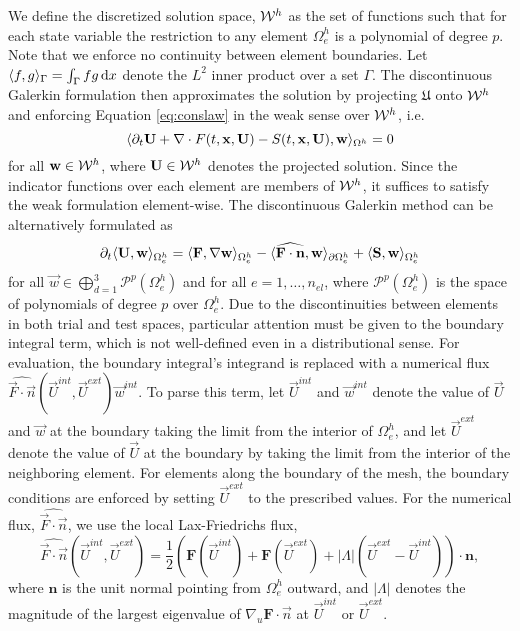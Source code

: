 We define the discretized solution space, $\mathcal{W}^h$ as the set of functions such that for each state variable the restriction to any element $\Omega_e^h$ is a polynomial of degree $p$.  Note that we enforce no continuity between element boundaries.  Let $\langle f , g\rangle_{\Gamma} = \int_{\Gamma} fg \,\mathrm{d} x$ denote the $L^2$ inner product over a set $\Gamma$. The discontinuous Galerkin formulation then approximates the solution by projecting $\mathfrak{U}$ onto $\mathcal{W}^h$ and enforcing Equation \eqref{eq:conslaw} in the weak sense over $\mathcal{W}^h$, i.e.
\begin{equation*}
\langle  \partial_t {\bf U} + \nabla \cdot F(t,{\bf x},{\bf U}) - S(t,{\bf x}, {\bf U}) , {\bf w}\rangle_{\Omega^h} = 0
\end{equation*}
for all ${\bf w} \in \mathcal{W}^h$, where ${\bf U} \in \mathcal{W}^h$ denotes the projected solution.  %
Since the indicator functions over each element are members of $\mathcal{W}^h$, it suffices to satisfy the weak formulation element-wise.
The discontinuous Galerkin method can be alternatively formulated as
\begin{equation}
\partial_t \langle {\bf U} , {\bf w} \rangle_{\Omega^h_e} = \langle {\bf F} , \nabla{\bf w} \rangle_{\Omega^h_e} - \langle \widehat{{\bf F}\cdot {\bf n}} , {\bf w} \rangle_{\partial \Omega^h_e} + \langle {\bf S} , {\bf w} \rangle_{\Omega^h_e}
\label{eq:dg}
\end{equation}
for all $\vec{w} \in \bigoplus_{d=1}^3 \mathcal{P}^p(\Omega_e^h)$ and for all $e = 1, \ldots, n_{el}$, where $\mathcal{P}^p(\Omega_e^h)$ is the space of polynomials of degree $p$ over $\Omega_e^h$. Due to the discontinuities between elements in both trial and test spaces, particular attention must be given to the boundary integral term, which is not well-defined even in a distributional sense. For evaluation, the boundary integral's integrand is replaced with a numerical flux $\widehat{\vec{F} \cdot \vec{n}}(\vec{U}^{int}, \vec{U}^{ext}) \vec{w}^{int}$. To parse this term, let $\vec{U}^{int}$ and $\vec{w}^{int}$ denote the value of $\vec{U}$ and $\vec{w}$ at the boundary taking the limit from the interior of $\Omega^h_e$, and let $\vec{U}^{ext}$ denote the value of $\vec{U}$ at the boundary by taking the limit from the interior of the neighboring element. For elements along the boundary of the mesh, the boundary conditions are enforced by setting $\vec{U}^{ext}$ to the prescribed values. For the numerical flux, $\widehat{\vec{F}\cdot\vec{n}}$, we use the local Lax-Friedrichs flux, 
\begin{equation*}
\widehat{\vec{F} \cdot \vec{n}}(\vec{U}^{int}, \vec{U}^{ext}) = \frac{1}{2} \left( \mathbf{F}(\vec{U}^{int}) + \mathbf{F}(\vec{U}^{ext}) + |\Lambda| (\vec{U}^{ext} - \vec{U}^{int}) \right) \cdot \mathbf{n},
\end{equation*}
where $\mathbf{n}$ is the unit normal pointing from $\Omega^h_e$ outward, and $|\Lambda|$ denotes the magnitude of the largest eigenvalue of $\nabla_u \mathbf{F} \cdot \vec{n}$ at $\vec{U}^{int}$ or $\vec{U}^{ext}$.

